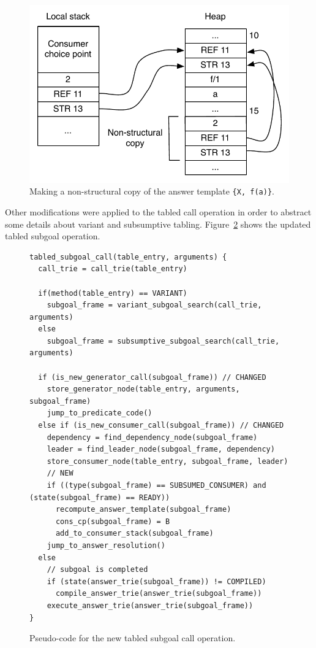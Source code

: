 \begin{figure}[H]
  \centering
    \includegraphics[scale=0.6]{non_structural_copy.pdf}
  \caption{Making a non-structural copy of the answer template \texttt{\{X,~f(a)\}}.}
  \label{fig:non_structural_copy}
\end{figure}

Other modifications were applied to the tabled call operation in order to abstract some details about
variant and subsumptive tabling. Figure~\ref{fig:tabled_subgoal_call_new} shows the updated tabled
subgoal operation.

\begin{figure}[ht]
\begin{Verbatim}
tabled_subgoal_call(table_entry, arguments) {
  call_trie = call_trie(table_entry)
  
  if(method(table_entry) == VARIANT)
    subgoal_frame = variant_subgoal_search(call_trie, arguments)
  else
    subgoal_frame = subsumptive_subgoal_search(call_trie, arguments)
  
  if (is_new_generator_call(subgoal_frame)) // CHANGED
    store_generator_node(table_entry, arguments, subgoal_frame)
    jump_to_predicate_code()
  else if (is_new_consumer_call(subgoal_frame)) // CHANGED
    dependency = find_dependency_node(subgoal_frame)
    leader = find_leader_node(subgoal_frame, dependency)
    store_consumer_node(table_entry, subgoal_frame, leader)
    // NEW
    if ((type(subgoal_frame) == SUBSUMED_CONSUMER) and (state(subgoal_frame) == READY))
      recompute_answer_template(subgoal_frame)
      cons_cp(subgoal_frame) = B
      add_to_consumer_stack(subgoal_frame)
    jump_to_answer_resolution()
  else
    // subgoal is completed
    if (state(answer_trie(subgoal_frame)) != COMPILED)
      compile_answer_trie(answer_trie(subgoal_frame))
    execute_answer_trie(answer_trie(subgoal_frame))
}
\end{Verbatim}
\caption{Pseudo-code for the new tabled subgoal call operation.}
\label{fig:tabled_subgoal_call_new}
\end{figure}

